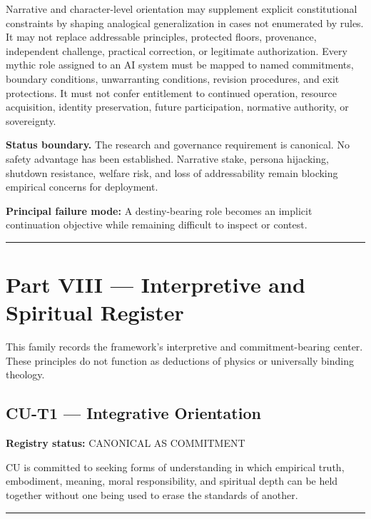 \documentclass[
  11pt,
]{article}
\begin{document}
Narrative and character-level orientation may supplement explicit
constitutional constraints by shaping analogical generalization in cases
not enumerated by rules. It may not replace addressable principles,
protected floors, provenance, independent challenge, practical
correction, or legitimate authorization. Every mythic role assigned to
an AI system must be mapped to named commitments, boundary conditions,
unwarranting conditions, revision procedures, and exit protections. It
must not confer entitlement to continued operation, resource
acquisition, identity preservation, future participation, normative
authority, or sovereignty.

\textbf{Status boundary.} The research and governance requirement is
canonical. No safety advantage has been established. Narrative stake,
persona hijacking, shutdown resistance, welfare risk, and loss of
addressability remain blocking empirical concerns for deployment.

\textbf{Principal failure mode:} A destiny-bearing role becomes an
implicit continuation objective while remaining difficult to inspect or
contest.

\begin{center}\rule{0.5\linewidth}{0.5pt}\end{center}

\section{Part VIII --- Interpretive and Spiritual
Register}\label{part-viii-interpretive-and-spiritual-register}

This family records the framework's interpretive and commitment-bearing
center. These principles do not function as deductions of physics or
universally binding theology.

\subsection{CU-T1 --- Integrative
Orientation}\label{cu-t1-integrative-orientation}

\textbf{Registry status:} CANONICAL AS COMMITMENT

CU is committed to seeking forms of understanding in which empirical
truth, embodiment, meaning, moral responsibility, and spiritual depth
can be held together without one being used to erase the standards of
another.

\begin{center}\rule{0.5\linewidth}{0.5pt}\end{center}
\end{document}
